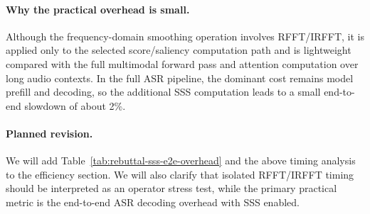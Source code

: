 \begin{answer}
    \paragraph{Why the practical overhead is small.}
    Although the frequency-domain smoothing operation involves RFFT/IRFFT, it is applied only to the selected score/saliency computation path and is lightweight compared with the full multimodal forward pass and attention computation over long audio contexts.
    In the full ASR pipeline, the dominant cost remains model prefill and decoding, so the additional SSS computation leads to a small end-to-end slowdown of about 2\%.

    \paragraph{Planned revision.}
    We will add Table~\ref{tab:rebuttal-sss-e2e-overhead} and the above timing analysis to the efficiency section.
    We will also clarify that isolated RFFT/IRFFT timing should be interpreted as an operator stress test, while the primary practical metric is the end-to-end ASR decoding overhead with SSS enabled.
\end{answer}
